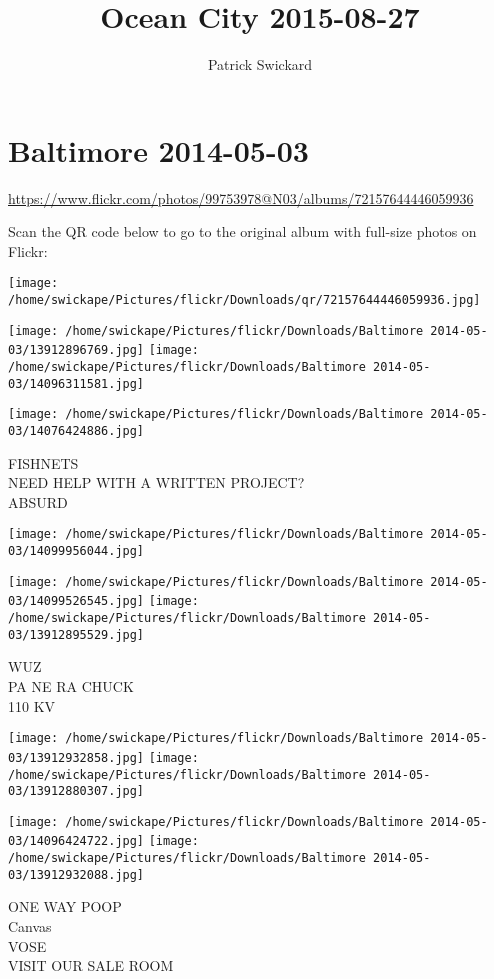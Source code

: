\documentclass[10pt,letterpaper]{article}
\title{Ocean City 2015-08-27}
\author{Patrick Swickard}
\date{}
\begin{document}
\section*{Baltimore 2014-05-03}

\url{https://www.flickr.com/photos/99753978@N03/albums/72157644446059936}

Scan the QR code below to go to the original album with full-size photos on Flickr:

\texttt{[image: /home/swickape/Pictures/flickr/Downloads/qr/72157644446059936.jpg]}
\pagebreak

\texttt{[image: /home/swickape/Pictures/flickr/Downloads/Baltimore 2014-05-03/13912896769.jpg]}
\texttt{[image: /home/swickape/Pictures/flickr/Downloads/Baltimore 2014-05-03/14096311581.jpg]}

\texttt{[image: /home/swickape/Pictures/flickr/Downloads/Baltimore 2014-05-03/14076424886.jpg]}

FISHNETS\\
NEED HELP WITH A WRITTEN PROJECT?\\
ABSURD
\pagebreak

\texttt{[image: /home/swickape/Pictures/flickr/Downloads/Baltimore 2014-05-03/14099956044.jpg]}

\vspace{0.25in}
\texttt{[image: /home/swickape/Pictures/flickr/Downloads/Baltimore 2014-05-03/14099526545.jpg]}
\texttt{[image: /home/swickape/Pictures/flickr/Downloads/Baltimore 2014-05-03/13912895529.jpg]}

WUZ\\
PA NE RA CHUCK\\
110 KV
\pagebreak

\texttt{[image: /home/swickape/Pictures/flickr/Downloads/Baltimore 2014-05-03/13912932858.jpg]}
\texttt{[image: /home/swickape/Pictures/flickr/Downloads/Baltimore 2014-05-03/13912880307.jpg]}

\texttt{[image: /home/swickape/Pictures/flickr/Downloads/Baltimore 2014-05-03/14096424722.jpg]}
\texttt{[image: /home/swickape/Pictures/flickr/Downloads/Baltimore 2014-05-03/13912932088.jpg]}

ONE WAY POOP\\
Canvas\\
VOSE\\
VISIT OUR SALE ROOM
\pagebreak
\end{document}

